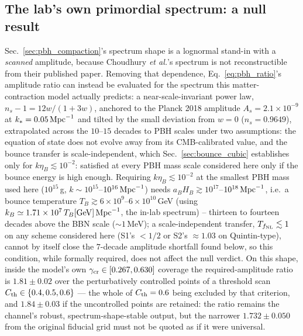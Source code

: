 \documentclass[aps,prd,twocolumn,superscriptaddress,nofootinbib,longbibliography]{revtex4-2}
\newcommand{\fnl}{f_{\rm NL}}
\begin{document}
\subsection{The lab's own primordial spectrum: a null result}
\label{sec:pbh_inlab}

Sec.~\ref{sec:pbh_compaction}'s spectrum shape is a lognormal stand-in with a
\emph{scanned} amplitude, because Choudhury \textit{et al.}'s spectrum is not
reconstructible from their published paper. Removing that dependence,
Eq.~\eqref{eq:pbh_ratio}'s amplitude ratio can instead be evaluated for the
spectrum this matter-contraction model actually predicts: a
near-scale-invariant power law, $n_s-1=12w/(1+3w)$, anchored to the Planck
2018 amplitude $A_s=2.1\times10^{-9}$ at $k_*=0.05\,{\rm Mpc}^{-1}$ and
tilted by the small deviation from $w=0$ ($n_s=0.9649$), extrapolated across
the $10$--$15$ decades to PBH scales under two assumptions: the equation of
state does not evolve away from its CMB-calibrated value, and the bounce
transfer is scale-independent, which Sec.~\ref{sec:bounce_cubic} establishes
only for $k\eta_B\lesssim10^{-2}$: satisfied at every PBH mass scale
considered here only if the bounce energy is high enough. Requiring
$k\eta_B\lesssim10^{-2}$ at the smallest PBH mass used here ($10^{15}\,$g,
$k\sim10^{15}$--$10^{16}\,{\rm Mpc}^{-1}$) needs $a_BH_B\gtrsim10^{17}$--$10^{18}\,{\rm
Mpc}^{-1}$, i.e.\ a bounce temperature $T_B\gtrsim6\times10^{9}$--$6\times10^{10}\,$GeV
(using $k_B\simeq1.71\times10^{7}\,T_B[{\rm GeV}]\,{\rm Mpc}^{-1}$,
the in-lab spectrum) --
thirteen to fourteen decades above the BBN scale ($\sim1\,$MeV); a scale-independent transfer, $T_{\fnl}\lesssim1$ on any scheme considered here (S1's $<1/2$ or S2's $\approx1.03$ on Quintin-type), cannot by
itself close the $7$-decade amplitude shortfall found below, so this
condition, while formally required, does not affect the null verdict. On
this shape, inside the model's own $\gamma_{\rm cr}\in[0.267,0.630]$
coverage the required-amplitude ratio is $1.81\pm0.02$ over the perturbatively
controlled points of a threshold scan $C_{\rm th}\in\{0.4,0.5,0.6\}$ --- the
whole of $C_{\rm th}=0.6$ being excluded by that criterion, and
$1.84\pm0.03$ if the uncontrolled points are retained: the ratio remains the channel's
robust, spectrum-shape-stable output, but the narrower $1.732\pm0.050$
from the original fiducial grid must not be quoted as if it were
universal.
\end{document}
